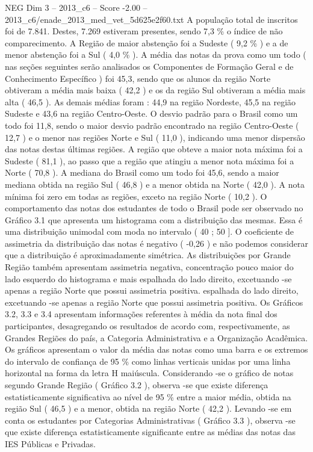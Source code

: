 \begin{textsample}{NEG Dim 3 – 2013\_c6 – Score -2.00 – 2013\_c6/enade\_2013\_med\_vet\_5d625e2f60.txt}
A população total de inscritos foi de 7.841.
Destes, 7.269 estiveram presentes, sendo 7,3 \% o índice de não comparecimento.
A Região de maior abstenção foi a Sudeste ( 9,2 \% ) e a de menor abstenção foi a Sul ( 4,0 \% ).
A média das notas da prova como um todo ( nas seções seguintes serão analisados os Componentes de Formação Geral e de Conhecimento Específico ) foi 45,3, sendo que os alunos da região Norte obtiveram a média mais baixa ( 42,2 ) e os da região Sul obtiveram a média mais alta ( 46,5 ).
As demais médias foram : 44,9 na região Nordeste, 45,5 na região Sudeste e 43,6 na região Centro-Oeste.
O desvio padrão para o Brasil como um todo foi 11,8, sendo o maior desvio padrão encontrado na região Centro-Oeste ( 12,7 ) e o menor nas regiões Norte e Sul ( 11,0 ), indicando uma menor dispersão das notas destas últimas regiões.
A região que obteve a maior nota máxima foi a Sudeste ( 81,1 ), ao passo que a região que atingiu a menor nota máxima foi a Norte ( 70,8 ).
A mediana do Brasil como um todo foi 45,6, sendo a maior mediana obtida na região Sul ( 46,8 ) e a menor obtida na Norte ( 42,0 ).
A nota mínima foi zero em todas as regiões, exceto na região Norte ( 10,2 ).
O comportamento das notas dos estudantes de todo o Brasil pode ser observado no Gráfico 3.1 que apresenta um histograma com a distribuição das mesmas.
Essa é uma distribuição unimodal com moda no intervalo ( 40 ; 50 ].
O coeficiente de assimetria da distribuição das notas é negativo ( -0,26 ) e não podemos considerar que a distribuição é aproximadamente simétrica.
As distribuições por Grande Região também apresentam assimetria negativa, concentração pouco maior do lado esquerdo do histograma e mais espalhada do lado direito, excetuando -se apenas a região Norte que possui assimetria positiva. espalhada do lado direito, excetuando -se apenas a região Norte que possui assimetria positiva.
Os Gráficos 3.2, 3.3 e 3.4 apresentam informações referentes à média da nota final dos participantes, desagregando os resultados de acordo com, respectivamente, as Grandes Regiões do país, a Categoria Administrativa e a Organização Acadêmica.
Os gráficos apresentam o valor da média das notas como uma barra e os extremos do intervalo de confiança de 95 \% como linhas verticais unidas por uma linha horizontal na forma da letra H maiúscula.
Considerando -se o gráfico de notas segundo Grande Região ( Gráfico 3.2 ), observa -se que existe diferença estatisticamente significativa ao nível de 95 \% entre a maior média, obtida na região Sul ( 46,5 ) e a menor, obtida na região Norte ( 42,2 ).
Levando -se em conta os estudantes por Categorias Administrativas ( Gráfico 3.3 ), observa -se que existe diferença estatisticamente significante entre as médias das notas das IES Públicas e Privadas.

\end{textsample}
